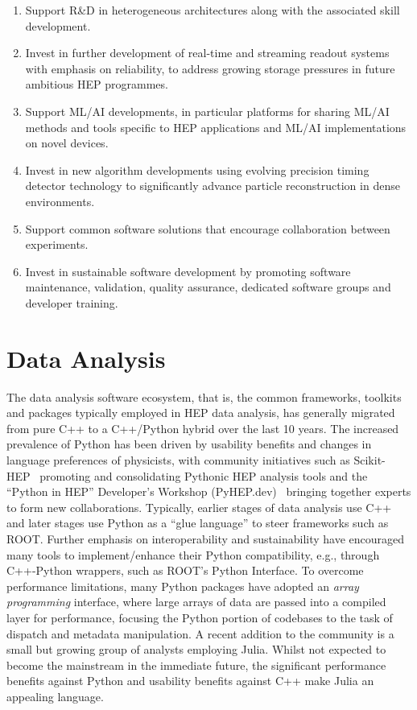 \documentclass[10pt,a4paper]{article}
\begin{document}
\begin{enumerate}
\def\labelenumi{\arabic{enumi}.}
\item
  Support R\&D in heterogeneous architectures along with the associated
  skill development.
\item
  Invest in further development of real-time and streaming readout systems with
  emphasis on reliability, to address growing storage pressures in future
  ambitious HEP programmes.
\item
  Support ML/AI developments, in particular platforms for sharing ML/AI
  methods and tools specific to HEP applications and ML/AI
  implementations on novel devices.
\item
  Invest in new algorithm developments using evolving precision timing
  detector technology to significantly advance particle reconstruction
  in dense environments.
\item
  Support common software solutions that encourage collaboration between
  experiments.
\item
  Invest in sustainable software development by promoting software
  maintenance, validation, quality assurance, dedicated software groups
  and developer training.
\end{enumerate}

\section{Data Analysis}\label{data-analysis}

The data analysis software ecosystem, that is, the common frameworks, toolkits
and packages typically employed in HEP data analysis, has generally migrated
from pure C++ to a C++/Python hybrid over the last 10 years. The increased
prevalence of Python has been driven by usability benefits and changes in
language preferences of physicists, with community initiatives such as
Scikit-HEP~\cite{Rodrigues_2020} promoting and consolidating Pythonic HEP
analysis tools and the ``Python in HEP'' Developer's Workshop
(PyHEP.dev)~\cite{alshehri2024pyhepdev2024workshopsummary} bringing together
experts to form new collaborations. Typically, earlier stages of data analysis
use C++ and later stages use Python as a ``glue language'' to steer frameworks
such as ROOT. Further emphasis on interoperability and sustainability have
encouraged many tools to implement/enhance their Python compatibility, e.g.,
through C++-Python wrappers, such as ROOT's Python Interface. To overcome
performance limitations, many Python packages have adopted an \emph{array
programming} interface, where large arrays of data are passed into a compiled
layer for performance, focusing the Python portion of codebases to the task of
dispatch and metadata manipulation. A recent addition to the community is a
small but growing group of analysts employing Julia. Whilst not expected to
become the mainstream in the immediate future, the significant performance
benefits against Python and usability benefits against C++ make Julia an
appealing language.
\end{document}
